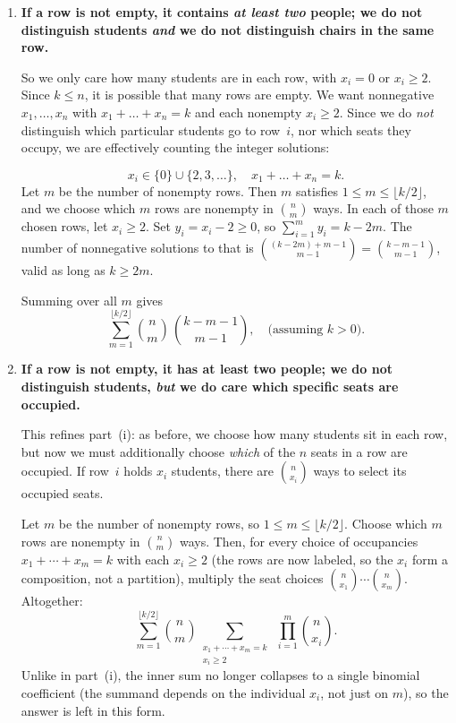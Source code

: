 \documentclass[docmute]{article}
\begin{document}
\begin{enumerate}
\begin{enumerate}
      But multiplying $\frac{k!}{x_1!\,x_2!\,x_3!}\times (x_1)!(x_2)!(x_3)! = k!.$
    \end{enumerate}

    Finally, we sum over all nonnegative $(x_1,x_2,x_3)$ summing to $k$.  The number of such triples is $\binom{k+3-1}{3-1} = \binom{k+2}{2}.$  Thus total seatings:
    \[
      k!\,\binom{k+2}{2}.
    \]

  \item[\textbf{(i)}]
    \textbf{If a row is not empty, it contains \emph{at least two} people; we do not distinguish students \emph{and} we do not distinguish chairs in the same row.}

    So we only care how many students are in each row, with $x_i=0$ or $x_i\ge2$.  Since $k\le n$, it is possible that many rows are empty.  We want nonnegative $x_1,\dots,x_n$ with $x_1+\dots+x_n = k$ and each nonempty $x_i\ge2$.  Since we do \emph{not} distinguish which particular students go to row~$i$, nor which seats they occupy, we are effectively counting the integer solutions:

    \[
      x_i \in \{0\}\cup \{2,3,\dots\}, 
      \quad x_1+\dots+x_n = k.
    \]
    Let $m$ be the number of nonempty rows.  Then $m$ satisfies $1 \le m \le \lfloor k/2 \rfloor$, and we choose which $m$ rows are nonempty in $\binom{n}{m}$ ways.  In each of those $m$ chosen rows, let $x_i \ge2$.  Set $y_i = x_i - 2 \ge 0$, so $\sum_{i=1}^m y_i = k - 2m.$  The number of nonnegative solutions to that is $\binom{(k-2m) + m -1}{m-1} = \binom{k - m -1}{m-1}$, valid as long as $k \ge 2m.$  

    Summing over all $m$ gives
    \[
      \sum_{m=1}^{\lfloor k/2 \rfloor}
        \binom{n}{m}\,\binom{k - m - 1}{m-1},
      \quad
      \text{(assuming $k>0$).}
    \]

  \item[\textbf{(j)}]
    \textbf{If a row is not empty, it has at least two people; we do not distinguish students, \emph{but} we do care which specific seats are occupied.}

    This refines part~(i): as before, we choose how many students sit in each row, but now we must additionally choose \emph{which} of the \(n\) seats in a row are occupied.  If row~\(i\) holds \(x_i\) students, there are \(\binom{n}{x_i}\) ways to select its occupied seats.

    Let \(m\) be the number of nonempty rows, so \(1 \le m \le \lfloor k/2 \rfloor\).  Choose which \(m\) rows are nonempty in \(\binom{n}{m}\) ways.  Then, for every choice of occupancies \(x_1 + \cdots + x_m = k\) with each \(x_i \ge 2\) (the rows are now labeled, so the \(x_i\) form a composition, not a partition), multiply the seat choices \(\binom{n}{x_1}\cdots\binom{n}{x_m}\).  Altogether:
    \[
      \sum_{m=1}^{\lfloor k/2 \rfloor}
        \binom{n}{m}
        \sum_{\substack{x_1+\cdots+x_m=k \\ x_i \ge 2}}
        \;\prod_{i=1}^{m} \binom{n}{x_i}.
    \]
    Unlike in part~(i), the inner sum no longer collapses to a single binomial coefficient (the summand depends on the individual \(x_i\), not just on \(m\)), so the answer is left in this form.


\end{enumerate}
\end{document}
